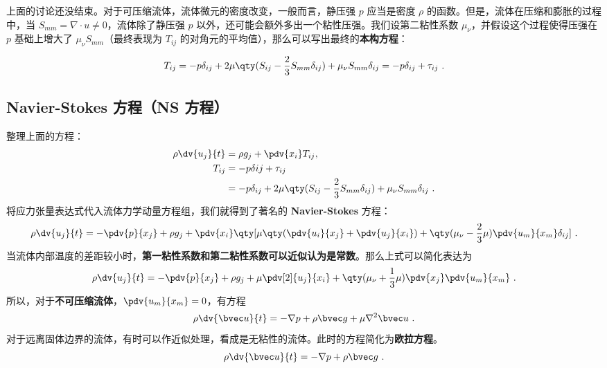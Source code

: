 上面的讨论还没结束。对于可压缩流体，流体微元的密度改变，一般而言，静压强 $p$ 应当是密度 $\rho$ 的函数。但是，流体在压缩和膨胀的过程中，当 $S_{mm}=\nabla\cdot u\neq 0$，流体除了静压强 $p$ 以外，还可能会额外多出一个粘性压强。我们设第二粘性系数 $\mu_\nu$，并假设这个过程使得压强在 $p$ 基础上增大了 $\mu_\nu S_{mm}$（最终表现为 $T_{ij}$ 的对角元的平均值），那么可以写出最终的\textbf{本构方程}：

\begin{equation}\label{NSeq_eq1}
T_{ij}=-p\delta_{ij}+2\mu \qty(S_{ij}-\frac{2}{3}S_{mm}\delta_{ij})+\mu_\nu S_{mm} \delta_{ij}=-p\delta_{ij}+\tau_{ij}~.
\end{equation}

\subsection{Navier-Stokes 方程（NS 方程）}
整理上面的方程：
\begin{equation}
\begin{aligned}
\rho \dv{u_j}{t}&=\rho g_j+\pdv{x_i} T_{ij},\\
T_{ij}&=-p\delta{ij}+\tau_{ij}\\
&=-p\delta_{ij}+2\mu \qty(S_{ij}-\frac{2}{3}S_{mm}\delta_{ij})+\mu_\nu S_{mm} \delta_{ij}~.
\end{aligned}
\end{equation}
将应力张量表达式代入流体力学动量方程组，我们就得到了著名的 \textbf{Navier-Stokes} 方程：
\begin{equation}
\rho \dv{u_j}{t}=-\pdv{p}{x_j}+\rho g_j+\pdv{x_i} \qty[\mu\qty(\pdv{u_i}{x_j}+\pdv{u_j}{x_i})+\qty(\mu_\nu-\frac{2}{3}\mu)\pdv{u_m}{x_m}\delta_{ij}]~.
\end{equation}
当流体内部温度的差距较小时，\textbf{第一粘性系数和第二粘性系数可以近似认为是常数}。那么上式可以简化表达为
\begin{equation}\label{NSeq_eq2}
\rho \dv{u_j}{t}=-\pdv{p}{x_j}+\rho g_j+\mu\pdv[2]{u_j}{x_i} +\qty(\mu_\nu+\frac{1}{3}\mu)\pdv{x_j}\pdv{u_m}{x_m}~.
\end{equation}
所以，对于\textbf{不可压缩流体}，$\pdv{u_m}{x_m}=0$，有方程
\begin{equation}
\rho \dv{\bvec u}{t}=-\nabla p+\rho \bvec g+\mu \nabla^2 \bvec u~.
\end{equation}
对于远离固体边界的流体，有时可以作近似处理，看成是无粘性的流体。此时的方程简化为\textbf{欧拉方程}。
\begin{equation}
\rho \dv{\bvec u}{t}=-\nabla p+\rho \bvec g~.
\end{equation}
